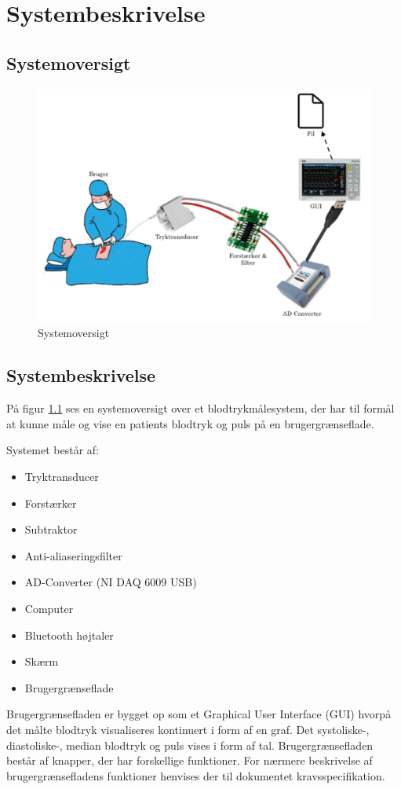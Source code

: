 \chapter{Systembeskrivelse}
\section{Systemoversigt}

	\begin{figure}[h!]
		\centering
		\includegraphics[width=0.55\linewidth]{Systembeskrivelse/Systemoversigt}
		\caption{Systemoversigt}
		\label{fig:Systemoversigt}
	\end{figure}
\vspace{1 cm}

\section{Systembeskrivelse}
På figur \ref{fig:Systemoversigt} ses en systemoversigt over et blodtrykmålesystem, der har til formål at kunne måle og vise en patients blodtryk og puls på en brugergrænseflade. 

Systemet består af:

\begin{itemize}
	\item Tryktransducer
	\item Forstærker
	\item Subtraktor
	\item Anti-aliaseringsfilter
	\item AD-Converter (NI DAQ 6009 USB)
	\item Computer
	\item Bluetooth højtaler
	\item Skærm
	\item Brugergrænseflade	
\end{itemize}

Brugergrænsefladen er bygget op som et Graphical User Interface (GUI) hvorpå det målte blodtryk visualiseres kontinuert i form af en graf. Det systoliske-, diastoliske-, median blodtryk og puls vises i form af tal. Brugergrænsefladen består af knapper, der har forskellige funktioner. For nærmere beskrivelse af brugergrænsefladens funktioner henvises der til dokumentet kravsspecifikation. \clearpage

